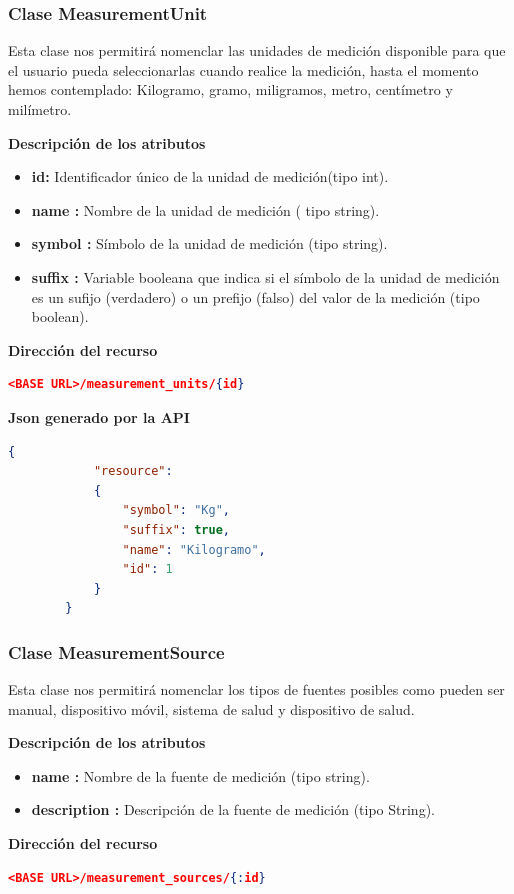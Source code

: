 \subsubsection{Clase MeasurementUnit}
Esta clase nos permitirá  nomenclar  las unidades de medición disponible para que el usuario pueda seleccionarlas cuando realice la medición, hasta el momento hemos contemplado: Kilogramo, gramo, miligramos, metro, centímetro y milímetro.

    \textbf{Descripción de los atributos}
        \begin{itemize}
            \item \textbf{id:	}	Identificador único de la unidad de medición(tipo int).
            \item \textbf{name :	}	Nombre de la unidad de medición ( tipo string).
            \item \textbf{symbol :}		Símbolo de la unidad de medición (tipo string).
            \item \textbf{suffix :}	Variable booleana que indica si el símbolo de la unidad de medición es un sufijo (verdadero) o un prefijo (falso) del valor de la medición (tipo boolean).
        \end{itemize}

    \textbf{Dirección del recurso}
        \begin{lstlisting}[language=json,firstnumber=1]
        <BASE URL>/measurement_units/{id}
        \end{lstlisting}

    \textbf{Json generado por la API} 
        \begin{lstlisting}[language=json,firstnumber=1]
        {
            "resource": 
            {
                "symbol": "Kg",
                "suffix": true,
                "name": "Kilogramo",
                "id": 1
            }
        }
        \end{lstlisting}

\subsubsection{Clase MeasurementSource}
Esta clase nos permitirá nomenclar los tipos de fuentes posibles como pueden ser manual, dispositivo móvil, sistema de salud y dispositivo de salud.
    
	\textbf{Descripción de los atributos}
        \begin{itemize}
            \item \textbf{name 	:}	Nombre de la fuente de medición (tipo string).
            \item \textbf{description 	:}	Descripción de la fuente de medición (tipo String).
        \end{itemize}
    \textbf{Dirección del recurso}
    \begin{lstlisting}[language=json,firstnumber=1]
    <BASE URL>/measurement_sources/{:id}
    \end{lstlisting}

